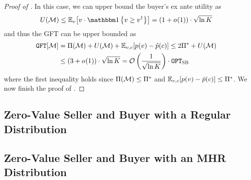 \begin{proof}[Proof of ]
     In this case, we can upper bound the buyer's ex ante utility as 
    \begin{align*}
        \buyerexanteutil(\mech) \leq \expect[\val]{\val\cdot \indicator{\val\geq \val\primed}} = (1 + o_{}(1))\cdot \sqrt{\ln \constantH}
    \end{align*}
    and thus the GFT can be upper bounded as
    \begin{align*}
        \GFT{\mech} &= \sellerexanteutil(\mech) + \buyerexanteutil(\mech) + \expect[\val,\cost]{\price(\val) - \sellerprice(\cost)}
        \leq 2 \sellerbenchmark + \buyerexanteutil(\mech) 
        \\
        &\leq (3 +o_{}(1))\cdot \sqrt{\ln \constantH}
        = \bigO_{}\left(\frac{1}{\sqrt{\ln\constantH}}\right)\cdot \OPTSB
    \end{align*}
    where the first inequality holds since $\Pi(\mathcal{M}) \leq \Pi^*$ and $\expect[\val,\cost]{\price(\val) - \sellerprice(\cost)}\leq\sellerbenchmark$.
    We now finish the proof of .
\end{proof}



\subsection{Zero-Value Seller and Buyer with a Regular Distribution}
\label{subsec:improved GFT:regular buyer}


\subsection{Zero-Value Seller and Buyer with an MHR Distribution}
\label{subsec:improved GFT:mhr buyer}

